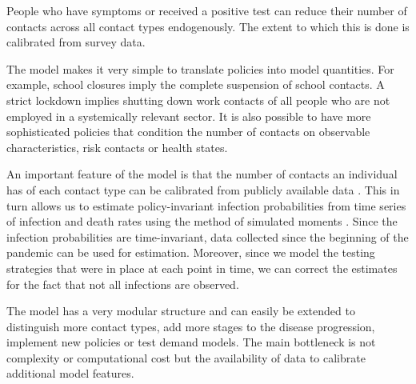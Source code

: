 People who have symptoms or received a positive test can reduce their number of contacts
across all contact types endogenously. The extent to which this is done is calibrated
from survey data.

The model makes it very simple to translate policies into model quantities. For example,
school closures imply the complete suspension of school contacts. A strict lockdown
implies shutting down work contacts of all people who are not employed in a systemically
relevant sector. It is also possible to have more sophisticated policies that condition
the number of contacts on observable characteristics, risk contacts or health states.

An important feature of the model is that the number of contacts an individual has of
each contact type can be calibrated from publicly available data \citep{Mossong2008}.
This in turn allows us to estimate policy-invariant infection probabilities from time
series of infection and death rates using the method of simulated moments
\citep{McFadden1989}. Since the infection probabilities are time-invariant, data
collected since the beginning of the pandemic can be used for estimation. Moreover,
since we model the testing strategies that were in place at each point in time, we can
correct the estimates for the fact that not all infections are observed.

The model has a very modular structure and can easily be extended to distinguish more
contact types, add more stages to the disease progression, implement new policies
or test demand models. The main bottleneck is not complexity or computational cost
but the availability of data to calibrate additional model features.
